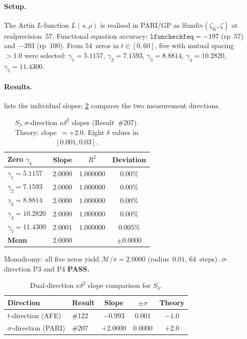 \documentclass[11pt, a4paper]{article}
\theoremstyle{plain}
\theoremstyle{definition}
\newcommand{\kap}{\kappa}             %
\newcommand{\mono}{\mathcal{M}}       %
\begin{document}
\paragraph{Setup.}
The Artin $L$-function $L(s,\rho)$ is realised in PARI/GP as
$\mathrm{lfundiv}(\zeta_{K},\zeta)$ at realprecision~$57$.
Functional equation accuracy: $\texttt{lfuncheckfeq}=-197$ (rp~$57$)
and~$-393$ (rp~$100$).  From $54$~zeros in $t\in[0,60]$, five with
mutual spacing~${>}1.0$ were selected:
$\gamma_{1}=5.1157$, $\gamma_{2}=7.1593$,
$\gamma_{3}=8.8814$, $\gamma_{4}=10.2820$, $\gamma_{5}=11.4300$.

\paragraph{Results.}
 lists the individual slopes;
\cref{tab:s3-twodir} compares the two measurement directions.

\begin{table}[ht]
\centering
\caption{$S_{3}$ $\sigma$-direction $\kap\delta^{2}$ slopes (Result~\#207).
  Theory: slope~$=+2.0$.  Eight $\delta$ values in $[0.001,0.03]$.}
\label{tab:s3-sigma}
\begin{tabular}{@{}lccc@{}}
\toprule
\textbf{Zero $\gamma_{k}$} & \textbf{Slope} & $R^{2}$ & \textbf{Deviation} \\
\midrule
$\gamma_{1}=5.1157$ & $2.0000$ & $1.000000$ & $0.00\%$ \\
$\gamma_{2}=7.1593$ & $2.0000$ & $1.000000$ & $0.00\%$ \\
$\gamma_{3}=8.8814$ & $2.0000$ & $1.000000$ & $0.00\%$ \\
$\gamma_{4}=10.2820$ & $2.0000$ & $1.000000$ & $0.00\%$ \\
$\gamma_{5}=11.4300$ & $2.0001$ & $1.000000$ & $0.005\%$ \\
\midrule
\textbf{Mean} & $\bm{2.0000}$ & & $\pm\bm{0.0000}$ \\
\bottomrule
\end{tabular}
\end{table}

Monodromy: all five zeros yield $\mono/\pi=2.0000$ (radius~$0.01$, 64~steps).
$\sigma$-direction P3 and P4 \textbf{PASS.}

\begin{table}[ht]
\centering
\caption{Dual-direction $\kap\delta^{2}$ slope comparison for $S_{3}$.}
\label{tab:s3-twodir}
\begin{tabular}{@{}llccc@{}}
\toprule
\textbf{Direction} & \textbf{Result} & \textbf{Slope} & $\pm\sigma$ & \textbf{Theory} \\
\midrule
$t$-direction (AFE) & \#122 & $-0.993$ & $0.001$ & $-1.0$ \\
$\sigma$-direction (PARI) & \#207 & $+2.0000$ & $0.0000$ & $+2.0$ \\
\bottomrule
\end{tabular}
\end{table}
\end{document}
